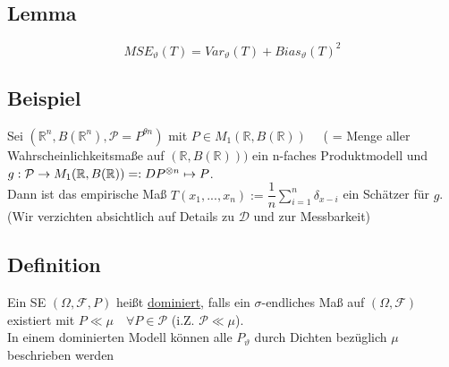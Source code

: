 \documentclass[german,10pt,oneside, fleqn, a4paper]{article}
\newcommand {\R}	{\mathbb{R}}
\newcommand{\ra}{\rightarrow}
\newcommand{\sm}[2][\infty]{\sum\limits_{#2}^{#1}}
\newcommand{\brc}[1]{\left(#1\right)}
\newcommand{\mc}[1]{\mathcal{#1}}
\newcommand{\1}[1]{1_{#1}}
\newcommand{\2}[1]{\1{\brac{#1}}}
\newcommand{\raum}{\brc{\Omega,\mc{F},P}}
\newcommand{\f}{\mc{F}}
\newcommand{\p}{\mc{P}}
\newcommand{\sumi}{\sm[n]{i=1}}
\newcommand{\qf}{\quad\forall}
\newcommand{\stuff}{{\otimes n}}
\begin{document}
\subsection{Lemma}
\label{9.4}
\[MSE_\vartheta(T)=Var_\vartheta(T)+Bias_\vartheta(T)^2\]

\subsection{Beispiel}
\label{9.5}
Sei $(\R^n,B(\R^n),\p=P^{\theta n})$ mit $P\in M_1(\R,B(\R))\quad$ ( = Menge aller Wahrscheinlichkeitsmaße auf $(\R,B(\R)))$ ein n-faches Produktmodell und $g:\p\ra M_1(\R,B(\R))=:D\\
P^\stuff\mapsto P$.\\
Dann ist das empirische Maß $T(x_1,...,x_n):=\dfrac{1}{n}\sumi\delta_{x-i}$ ein Schätzer für $g$. (Wir verzichten absichtlich auf Details zu $\mc{D}$ und zur Messbarkeit)

\subsection{Definition}
\label{9.6}
Ein SE $\raum$ heißt \underline{dominiert}, falls ein $\sigma$-endliches Maß auf $(\Omega,\f)$ existiert mit $P\ll\mu\qf P\in\p$ (i.Z. $\p\ll\mu$).\\
In einem dominierten Modell können alle $P_\vartheta$ durch Dichten bezüglich $\mu$ beschrieben werden
\end{document}

